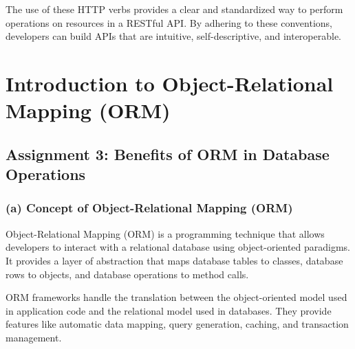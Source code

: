 \documentclass{article}
\begin{document}
The use of these HTTP verbs provides a clear and standardized way to perform operations on resources in a RESTful API. By adhering to these conventions, developers can build APIs that are intuitive, self-descriptive, and interoperable.

\section*{Introduction to Object-Relational Mapping (ORM)}

\subsection*{Assignment 3: Benefits of ORM in Database Operations}
\subsubsection*{(a) Concept of Object-Relational Mapping (ORM)}
Object-Relational Mapping (ORM) is a programming technique that allows developers to interact with a relational database using object-oriented paradigms. It provides a layer of abstraction that maps database tables to classes, database rows to objects, and database operations to method calls.

ORM frameworks handle the translation between the object-oriented model used in application code and the relational model used in databases. They provide features like automatic data mapping, query generation, caching, and transaction management.
\end{document}
